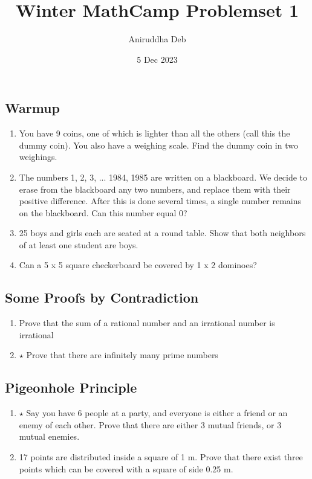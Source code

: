 \documentclass[12pt]{article}
\begin{document}
\title{\vspace{-60pt}Winter MathCamp Problemset 1}
\author{Aniruddha Deb}
\date{5 Dec 2023}

\maketitle

\subsection*{Warmup}

\begin{enumerate}[label=Q\arabic*.,resume]
    \item You have 9 coins, one of which is lighter than all the others (call 
        this the dummy coin). You also have a weighing scale. Find the dummy 
        coin in two weighings.
    \item The numbers 1, 2, 3, ... 1984, 1985 are written on a blackboard. We
        decide to erase from the blackboard any two numbers, and replace them
        with their positive difference. After this is done several times, a
        single number remains on the blackboard. Can this number equal 0?
    \item 25 boys and girls each are seated at a round table. Show
        that both neighbors of at least one student are boys.
    \item Can a 5 x 5 square checkerboard be covered by 1 x 2 dominoes?

\end{enumerate}

\subsection*{Some Proofs by Contradiction}

\begin{enumerate}[label=Q\arabic*.,resume]
    \item Prove that the sum of a rational number and an irrational number is 
        irrational 
    \item $\star$ Prove that there are infinitely many prime numbers 
\end{enumerate}

\subsection*{Pigeonhole Principle}

\begin{enumerate}[label=Q\arabic*.,resume]
    \item $\star$ Say you have 6 people at a party, and everyone is either a friend or
        an enemy of each other. Prove that there are either 3 mutual friends,
        or 3 mutual enemies. 

    \item 17 points are distributed inside a square of 1 m. Prove that there
        exist three points which can be covered with a square of side 0.25 m.
\end{enumerate}
\end{document}
